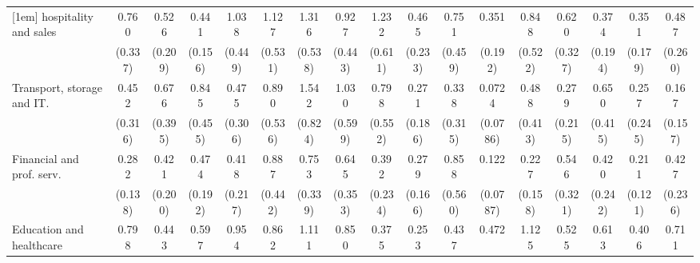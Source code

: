 {\begin{tabular}{l*{16}{c}}
[1em]
hospitality and sales&       0.760         &       0.526         &       0.441\sym{*}  &       1.038         &       1.127         &       1.316         &       0.927         &       1.232         &       0.465         &       0.751         &       0.351         &       0.848         &       0.620         &       0.374         &       0.351\sym{*}  &       0.487         \\
                    &     (0.337)         &     (0.209)         &     (0.156)         &     (0.449)         &     (0.531)         &     (0.538)         &     (0.443)         &     (0.611)         &     (0.233)         &     (0.459)         &     (0.192)         &     (0.522)         &     (0.327)         &     (0.194)         &     (0.179)         &     (0.260)         \\
[1em]
Transport, storage and IT.&       0.452         &       0.676         &       0.845         &       0.475         &       0.890         &       1.542         &       1.030         &       0.798         &       0.271         &       0.338         &      0.0724\sym{*}  &       0.488         &       0.279         &       0.650         &       0.257         &       0.167         \\
                    &     (0.316)         &     (0.395)         &     (0.455)         &     (0.306)         &     (0.536)         &     (0.824)         &     (0.599)         &     (0.552)         &     (0.186)         &     (0.315)         &    (0.0786)         &     (0.413)         &     (0.215)         &     (0.415)         &     (0.245)         &     (0.157)         \\
[1em]
Financial and prof. serv.&       0.282\sym{**} &       0.421         &       0.474         &       0.418         &       0.887         &       0.753         &       0.645         &       0.392         &       0.279\sym{*}  &       0.858         &       0.122\sym{**} &       0.227\sym{*}  &       0.546         &       0.420         &       0.211\sym{**} &       0.427         \\
                    &     (0.138)         &     (0.200)         &     (0.192)         &     (0.217)         &     (0.442)         &     (0.339)         &     (0.353)         &     (0.234)         &     (0.166)         &     (0.560)         &    (0.0787)         &     (0.158)         &     (0.321)         &     (0.242)         &     (0.121)         &     (0.236)         \\
[1em]
Education and healthcare&       0.798         &       0.443         &       0.597         &       0.954         &       0.862         &       1.111         &       0.850         &       0.375         &       0.253\sym{**} &       0.437         &       0.472         &       1.125         &       0.525         &       0.613         &       0.406         &       0.711         \\

\end{tabular}}
